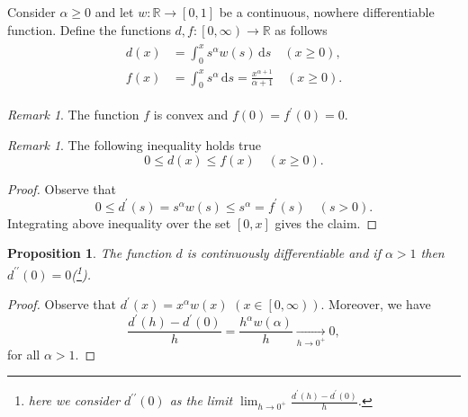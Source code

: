 \documentclass[12pt]{article}
\newcommand{\R}{\mathbb{R}}
\newcommand{\dd}{\,\mathrm{d}}
\newcommand{\dprime}{{\prime\prime}}
\renewcommand{\leq}{\leqslant}
\renewcommand{\geq}{\geqslant}
\newcommand{\convto}[2]{\xrightarrow[#2]{#1}}
\newcommand{\paren}[1]{\! \left( #1 \right)}
\newcommand{\bracket}[1]{\! \left[ #1 \right]}
\theoremstyle{plain}
\newtheorem{proposition}[theorem]{Proposition}
\theoremstyle{definition}
\theoremstyle{remark}
\newtheorem{remark}[theorem]{Remark}
\begin{document}
Consider $\alpha \geq 0$ and let $w \colon \R \to \bracket{0, 1}$ be a continuous, nowhere differentiable function.
Define the functions $d, f \colon \left[0, \infty\right) \to \R$ as follows
\begin{align} \label{eq::definition_of_d_and_f}
    \begin{split}
        d\paren{x} & = \int_0^x s^\alpha w\paren{s} \dd s \quad \paren{x \geq 0}, \\
        f\paren{x} & = \int_0^x s^\alpha \dd s = \frac{x^{\alpha+1}}{\alpha+1} \quad \paren{x \geq 0}.
    \end{split}
\end{align}
 
\begin{remark} \label{remark::properties_of_f}
    The function $f$ is convex and $f\paren{0} = f^\prime\paren{0} = 0$.
\end{remark}

\begin{remark} \label{remark::estimate}
    The following inequality holds true 
    \begin{equation*}
        0 \leq d\paren{x} \leq f\paren{x} \quad \paren{x \geq 0}.
     \end{equation*}
\end{remark}
\begin{proof}
    Observe that
    \begin{equation*}
        0 \leq d^\prime\paren{s} = s^\alpha w\paren{s} \leq s^\alpha = f^\prime\paren{s} \quad \paren{s > 0}.
    \end{equation*}
    Integrating above inequality over the set $\bracket{0, x}$ gives the claim.
\end{proof}
 
\begin{proposition} \label{prop::d_is_C1}
    The function $d$ is continuously differentiable and if $\alpha>1$ then $d^\dprime\paren{0} = 0$(\footnote{here we consider $d^\dprime\paren{0}$ as the limit $\lim_{h \to 0^+} \frac{d^\prime\paren{h} - d^\prime\paren{0}}{h}$.}).
\end{proposition}
\begin{proof}
    Observe that $d^\prime\paren{x} = x^\alpha w\paren{x}$ $\paren{x \in \left[0, \infty\right)}$.
    Moreover, we have
    \begin{equation*}
        \frac{d^\prime\paren{h} - d^\prime\paren{0}}{h} = \frac{h^\alpha w\paren{\alpha}}{h} \convto{}{h \to 0^+} 0,
    \end{equation*}
    for all $\alpha > 1$.
\end{proof}
\end{document}
